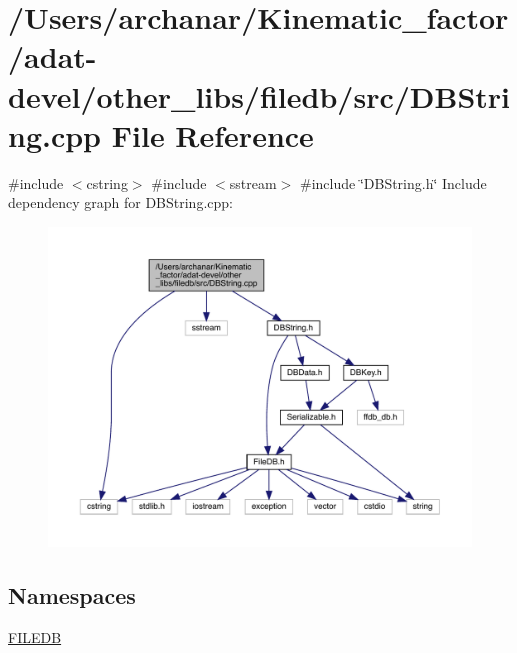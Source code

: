 \hypertarget{adat-devel_2other__libs_2filedb_2src_2DBString_8cpp}{}\section{/\+Users/archanar/\+Kinematic\+\_\+factor/adat-\/devel/other\+\_\+libs/filedb/src/\+D\+B\+String.cpp File Reference}
\label{adat-devel_2other__libs_2filedb_2src_2DBString_8cpp}
{\ttfamily \#include $<$cstring$>$}\newline
{\ttfamily \#include $<$sstream$>$}\newline
{\ttfamily \#include \char`\"{}D\+B\+String.\+h\char`\"{}}\newline
Include dependency graph for D\+B\+String.\+cpp\+:
\nopagebreak
\begin{figure}[H]
\begin{center}
\leavevmode
\includegraphics[width=350pt]{df/dd4/adat-devel_2other__libs_2filedb_2src_2DBString_8cpp__incl}
\end{center}
\end{figure}
\subsection*{Namespaces}
\begin{DoxyCompactItemize}
\item 
 \mbox{\hyperlink{namespaceFILEDB}{F\+I\+L\+E\+DB}}
\end{DoxyCompactItemize}

